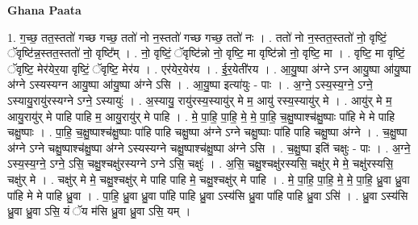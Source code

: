 \documentclass[17pt]{extarticle}
\begin{document}
\textbf{Ghana Paata } \newline

1. ग॒च्छ॒ तत॒स्ततो॑ गच्छ गच्छ॒ ततो॑ नो न॒स्ततो॑ गच्छ गच्छ॒ ततो॑ नः । . ततो॑ नो न॒स्तत॒स्ततो॑ नो॒ वृष्टिं॒ ॅवृष्टि॑न्न॒स्तत॒स्ततो॑ नो॒ वृष्टि᳚म् । . नो॒ वृष्टिं॒ ॅवृष्टि॑न्नो नो॒ वृष्टि॒ मा वृष्टि॑न्नो नो॒ वृष्टि॒ मा । . वृष्टि॒ मा वृष्टिं॒ ॅवृष्टि॒ मेर॑येर॒या वृष्टिं॒ ॅवृष्टि॒ मेर॑य । . एर॑येर॒येर॑य । . ई॒र॒येती॑रय । . आ॒यु॒ष्पा अ॑ग्ने ऽग्न आयु॒ष्पा आ॑यु॒ष्पा अ॑ग्ने ऽस्यस्यग्न आयु॒ष्पा आ॑यु॒ष्पा अ॑ग्ने ऽसि । . आ॒यु॒ष्पा इत्या॑युः - पाः । . अ॒ग्ने॒ ऽस्य॒स्य॒ग्ने॒ ऽग्ने॒ ऽस्यायु॒रायु॑रस्यग्ने ऽग्ने॒ ऽस्यायुः॑ । . अ॒स्यायु॒ रायु॑रस्य॒स्यायु॑र् मे म॒ आयु॑ रस्य॒स्यायु॑र् मे । . आयु॑र् मे म॒ आयु॒रायु॑र् मे पाहि पाहि म॒ आयु॒रायु॑र् मे पाहि । . मे॒ पा॒हि॒ पा॒हि॒ मे॒ मे॒ पा॒हि॒ च॒क्षु॒ष्पाश्च॑क्षु॒ष्पाः पा॑हि मे मे पाहि चक्षु॒ष्पाः । . पा॒हि॒ च॒क्षु॒ष्पाश्च॑क्षु॒ष्पाः पा॑हि पाहि चक्षु॒ष्पा अ॑ग्ने ऽग्ने चक्षु॒ष्पाः पा॑हि पाहि चक्षु॒ष्पा अ॑ग्ने । . च॒क्षु॒ष्पा अ॑ग्ने ऽग्ने चक्षु॒ष्पाश्च॑क्षु॒ष्पा अ॑ग्ने ऽस्यस्यग्ने चक्षु॒ष्पाश्च॑क्षु॒ष्पा अ॑ग्ने ऽसि । . च॒क्षु॒ष्पा इति॑ चक्षुः - पाः । . अ॒ग्ने॒ ऽस्य॒स्य॒ग्ने॒ ऽग्ने॒ ऽसि॒ चक्षु॒श्चक्षु॑रस्यग्ने ऽग्ने ऽसि॒ चक्षुः॑ । . अ॒सि॒ चक्षु॒श्चक्षु॑रस्यसि॒ चक्षु॑र् मे मे॒ चक्षु॑रस्यसि॒ चक्षु॑र् मे । . चक्षु॑र् मे मे॒ चक्षु॒श्चक्षु॑र् मे पाहि पाहि मे॒ चक्षु॒श्चक्षु॑र् मे पाहि । . मे॒ पा॒हि॒ पा॒हि॒ मे॒ मे॒ पा॒हि॒ ध्रु॒वा ध्रु॒वा पा॑हि मे मे पाहि ध्रु॒वा । . पा॒हि॒ ध्रु॒वा ध्रु॒वा पा॑हि पाहि ध्रु॒वा ऽस्य॑सि ध्रु॒वा पा॑हि पाहि ध्रु॒वा ऽसि॑ । . ध्रु॒वा ऽस्य॑सि ध्रु॒वा ध्रु॒वा ऽसि॒ यं ॅय म॑सि ध्रु॒वा ध्रु॒वा ऽसि॒ यम् । \newline
\end{document}

